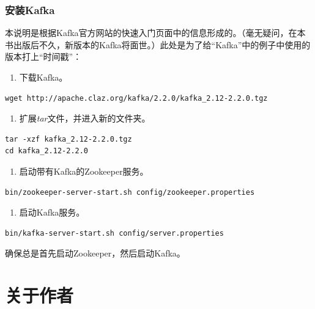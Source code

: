 \documentclass[
]{article}
\providecommand{\tightlist}{%
  \setlength{\itemsep}{0pt}\setlength{\parskip}{0pt}}
\begin{document}
\hypertarget{ux5b89ux88c5kafka}{%
\subsubsection{安装Kafka}\label{ux5b89ux88c5kafka}}

本说明是根据Kafka官方网站的快速入门页面中的信息形成的。（毫无疑问，在本书出版后不久，新版本的Kafka将面世。）此处是为了给``Kafka''中的例子中使用的版本打上``时间戳''：

\begin{enumerate}
\def\labelenumi{\arabic{enumi}.}
\tightlist
\item
  下载Kafka。
\end{enumerate}

\begin{verbatim}
wget http://apache.claz.org/kafka/2.2.0/kafka_2.12-2.2.0.tgz
\end{verbatim}

\begin{enumerate}
\def\labelenumi{\arabic{enumi}.}
\setcounter{enumi}{1}
\tightlist
\item
  扩展\emph{tar}文件，并进入新的文件夹。
\end{enumerate}

\begin{verbatim}
tar -xzf kafka_2.12-2.2.0.tgz
cd kafka_2.12-2.2.0
\end{verbatim}

\begin{enumerate}
\def\labelenumi{\arabic{enumi}.}
\setcounter{enumi}{2}
\tightlist
\item
  启动带有Kafka的Zookeeper服务。
\end{enumerate}

\begin{verbatim}
bin/zookeeper-server-start.sh config/zookeeper.properties
\end{verbatim}

\begin{enumerate}
\def\labelenumi{\arabic{enumi}.}
\setcounter{enumi}{3}
\tightlist
\item
  启动Kafka服务。
\end{enumerate}

\begin{verbatim}
bin/kafka-server-start.sh config/server.properties
\end{verbatim}

确保总是首先启动Zookeeper，然后启动Kafka。

\hypertarget{ux5173ux4e8eux4f5cux8005}{%
\section{关于作者}\label{ux5173ux4e8eux4f5cux8005}}
\end{document}
